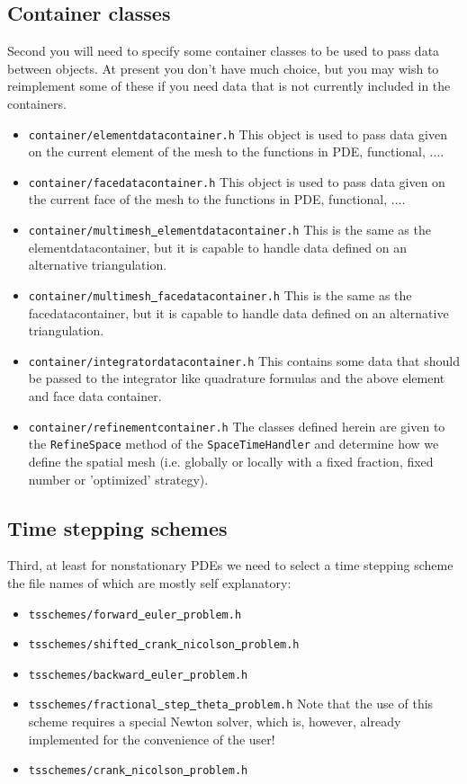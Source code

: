 \subsection{Container classes}
Second you will need to specify some container classes to be used to 
pass data between objects. At present you don't have much choice, but you may wish 
to reimplement some of these if you need data that is not currently included in 
the containers.
\begin{itemize}
\item \texttt{container/elementdatacontainer.h} This object is used to pass data 
  given on the current element of the mesh to the functions in PDE, functional, 
  $\ldots$. 
\item \texttt{container/facedatacontainer.h} This object is used to pass data 
  given on the current face of the mesh to the functions in PDE, functional, 
  $\ldots$. 
\item \texttt{container/multimesh\underline{ }elementdatacontainer.h} This is the same as the 
  elementdatacontainer, but it
  is capable to handle data defined on an alternative triangulation.
\item \texttt{container/multimesh\underline{ }facedatacontainer.h} This is the same as the
  facedatacontainer, but it
  is capable to handle data defined on an alternative triangulation.
\item \texttt{container/integratordatacontainer.h} This contains some data that 
  should be passed to the integrator like quadrature formulas and the above element and 
  face data container.
\item \texttt{container/refinementcontainer.h} The classes defined herein are given to the \texttt{RefineSpace} method of the \texttt{SpaceTimeHandler} and determine how we define the spatial mesh (i.e. globally or locally with a fixed fraction, fixed number or 'optimized' strategy).
\end{itemize}

\subsection{Time stepping schemes}
Third, at least for nonstationary PDEs we need to select a time stepping scheme
the file names of which are mostly self explanatory:
\begin{itemize}
\item \texttt{tsschemes/forward\underline{ }euler\underline{ }problem.h}
\item \texttt{tsschemes/shifted\underline{ }crank\underline{ }nicolson\underline{ }problem.h}
\item \texttt{tsschemes/backward\underline{ }euler\underline{ }problem.h}
\item \texttt{tsschemes/fractional\underline{ }step\underline{ }theta\underline{ }problem.h} Note that the use of this scheme requires a special Newton solver, which is, however, already
implemented for the convenience of the user!
\item \texttt{tsschemes/crank\underline{ }nicolson\underline{ }problem.h}
\end{itemize}

